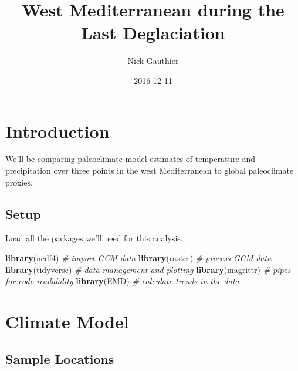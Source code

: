 \documentclass[11pt,]{tufte-handout}
\title{West Mediterranean during the Last Deglaciation}
\author{Nick Gauthier}
\date{2016-12-11}
\newenvironment{Shaded}{}{}
\newcommand{\KeywordTok}[1]{\textcolor[rgb]{0.00,0.44,0.13}{\textbf{{#1}}}}
\newcommand{\CommentTok}[1]{\textcolor[rgb]{0.38,0.63,0.69}{\textit{{#1}}}}
\newcommand{\NormalTok}[1]{{#1}}
\begin{document}
\maketitle




\section{Introduction}\label{introduction}

We'll be comparing paleoclimate model estimates of temperature and
precipitation over three points in the west Mediterranean to global
paleoclimate proxies.

\subsection{Setup}\label{setup}

Load all the packages we'll need for this analysis.


\begin{Shaded}
\begin{Highlighting}[]
\KeywordTok{library}\NormalTok{(ncdf4) }\CommentTok{# import GCM data}
\KeywordTok{library}\NormalTok{(raster) }\CommentTok{# process GCM data}
\KeywordTok{library}\NormalTok{(tidyverse) }\CommentTok{# data management and plotting}
\KeywordTok{library}\NormalTok{(magrittr) }\CommentTok{# pipes for code readability}
\KeywordTok{library}\NormalTok{(EMD) }\CommentTok{# calculate trends in the data}
\end{Highlighting}
\end{Shaded}

\section{Climate Model}\label{climate-model}

\subsection{Sample Locations}\label{sample-locations}
\end{document}

